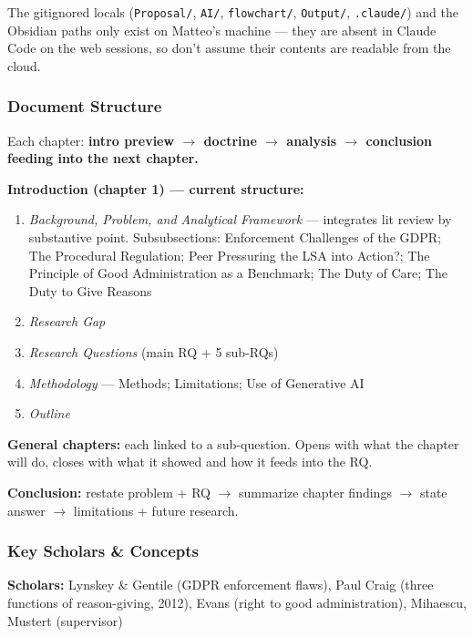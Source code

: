 The gitignored locals (\texttt{Proposal/}, \texttt{AI/}, \texttt{flowchart/},
\texttt{Output/}, \texttt{.claude/}) and the Obsidian paths only exist on
Matteo's machine --- they are absent in Claude Code on the web sessions, so don't
assume their contents are readable from the cloud.

\subsubsection{Document Structure}

Each chapter: \textbf{intro preview $\rightarrow$ doctrine $\rightarrow$ analysis
$\rightarrow$ conclusion feeding into the next chapter.}

\textbf{Introduction (chapter 1) --- current structure:}

\begin{enumerate}
  \item \textit{Background, Problem, and Analytical Framework} --- integrates lit
        review by substantive point. Subsubsections: Enforcement Challenges of the
        GDPR; The Procedural Regulation; Peer Pressuring the LSA into Action?; The
        Principle of Good Administration as a Benchmark; The Duty of Care; The Duty
        to Give Reasons
  \item \textit{Research Gap}
  \item \textit{Research Questions} (main RQ + 5 sub-RQs)
  \item \textit{Methodology} --- Methods; Limitations; Use of Generative AI
  \item \textit{Outline}
\end{enumerate}

\textbf{General chapters:} each linked to a sub-question. Opens with what the
chapter will do, closes with what it showed and how it feeds into the RQ.

\textbf{Conclusion:} restate problem + RQ $\rightarrow$ summarize chapter findings
$\rightarrow$ state answer $\rightarrow$ limitations + future research.

\subsubsection{Key Scholars \& Concepts}

\textbf{Scholars:} Lynskey \& Gentile (GDPR enforcement flaws), Paul Craig (three
functions of reason-giving, 2012), Evans (right to good administration), Mihaescu,
Mustert (supervisor)

